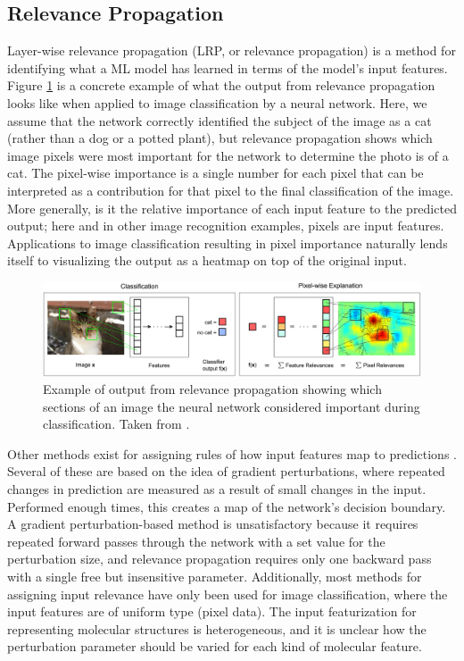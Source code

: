 \documentclass[12pt]{article}
\begin{document}
\subsection{Relevance Propagation}
\label{sec:org7bf91ac}

Layer-wise relevance propagation (LRP, or relevance propagation) is a method for identifying what a ML model has learned \cite{10.1371/journal.pone.0130140} in terms of the model's input features. Figure \ref{fig:org145793d} is a concrete example of what the output from relevance propagation looks like when applied to image classification by a neural network. Here, we assume that the network correctly identified the subject of the image as a cat (rather than a dog or a potted plant), but relevance propagation shows which image pixels were most important for the network to determine the photo is of a cat. The pixel-wise importance is a single number for each pixel that can be interpreted as a contribution for that pixel to the final classification of the image. More generally, is it the relative importance of each input feature to the predicted output; here and in other image recognition examples, pixels are input features. Applications to image classification resulting in pixel importance naturally lends itself to visualizing the output as a heatmap on top of the original input.

\begin{figure}[htbp]
\centering
\includegraphics[width=.9\linewidth]{2-Figure1-1.png}
\caption{\label{fig:org145793d}
Example of output from relevance propagation showing which sections of an image the neural network considered important during classification. Taken from \parencite{10.1371/journal.pone.0130140}.}
\end{figure}

Other methods exist for assigning rules of how input features map to predictions \cite{Finnegan105957,2017arXiv170303717S,2016arXiv161107478L}. Several of these are based on the idea of gradient perturbations, where repeated changes in prediction are measured as a result of small changes in the input. Performed enough times, this creates a map of the network's decision boundary\cite{wiki:db}. A gradient perturbation-based method is unsatisfactory because it requires repeated forward passes through the network with a set value for the perturbation size, and relevance propagation requires only one backward pass with a single free but insensitive parameter. Additionally, most methods for assigning input relevance have only been used for image classification, where the input features are of uniform type (pixel data). The input featurization for representing molecular structures\cite{2017arXiv170205532F} is heterogeneous, and it is unclear how the perturbation parameter should be varied for each kind of molecular feature.
\end{document}
